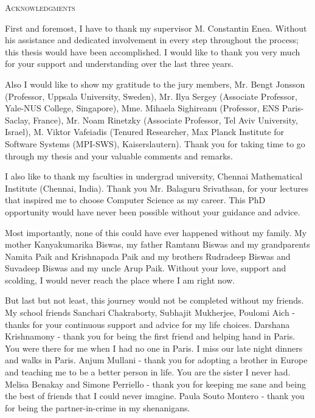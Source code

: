 \begin{center}
    \textsc{Acknowledgments}
  \end{center}
  \noindent

First and foremost, I have to thank my supervisor M. Constantin Enea. Without his assistance and dedicated involvement in every step throughout the process; this thesis would have been accomplished. I would like to thank you very much for your support and understanding over the last three years.

Also I would like to show my gratitude to the jury members, Mr. Bengt Jonsson (Professor, Uppsala University, Sweden), Mr. Ilya Sergey (Associate Professor, Yale-NUS College, Singapore), Mme. Mihaela Sighireanu (Professor, ENS Paris-Saclay, France), Mr. Noam Rinetzky (Associate Professor, Tel Aviv University, Israel), M. Viktor Vafeiadis (Tenured Researcher, Max Planck Institute for Software Systems (MPI-SWS), Kaiserslautern). Thank you for taking time to go through my thesis and your valuable comments and remarks.

I also like to thank my faculties in undergrad university, Chennai Mathematical Institute (Chennai, India). Thank you Mr. Balaguru Srivathsan, for your lectures that inspired me to choose Computer Science as my career. This PhD opportunity would have never been possible without your guidance and advice.

Most importantly, none of this could have ever happened without my family. My mother Kanyakumarika Biswas, my father Ramtanu Biswas and my grandparents Namita Paik and Krishnapada Paik and my brothers Rudradeep Biswas and Suvadeep Biswas and my uncle Arup Paik. Without your love, support and scolding, I would never reach the place where I am right now.

But last but not least, this journey would not be completed without my friends. My school friends Sanchari Chakraborty, Subhajit Mukherjee, Poulomi Aich - thanks for your continuous support and advice for my life choices. Darshana Krishnamony - thank you for being the first friend and helping hand in Paris. You were there for me when I had no one in Paris. I miss our late night dinners and walks in Paris. Anjum Mullani - thank you for adopting a brother in Europe and teaching me to be a better person in life. You are the sister I never had. Melisa Benakay and Simone Perriello - thank you for keeping me sane and being the best of friends that I could never imagine. Paula Souto Montero - thank you for being the partner-in-crime in my shenanigans.

  